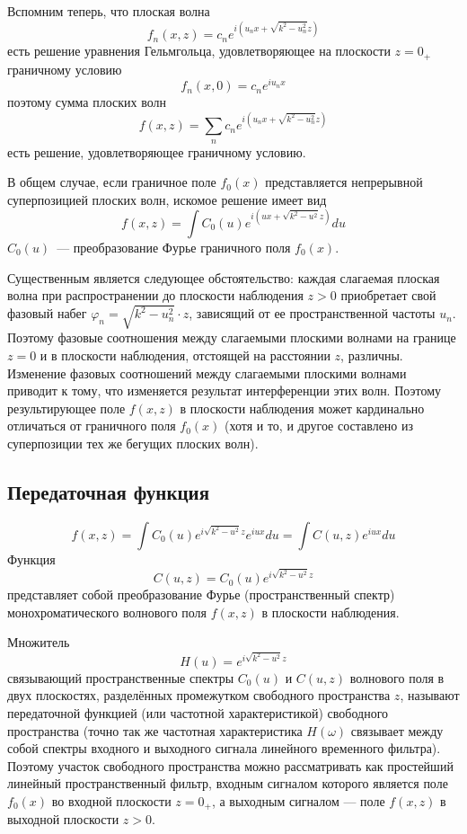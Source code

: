 Вспомним теперь, что плоская волна
\[
    f_n(x, z) = c_n e^{i(u_nx + \sqrt{k^2-u_n^2}z)}
\]
есть решение уравнения Гельмгольца, удовлетворяющее на плоскости $z=0_+$ граничному условию
\[
    f_n(x, 0) = c_n e^{iu_nx}
\]
поэтому сумма плоских волн
\[
    f(x,z) = \sum_n c_n e^{i(u_nx + \sqrt{k^2-u_n^2}z)}
\]
есть решение, удовлетворяющее граничному условию.

В общем случае, если граничное поле $f_0(x)$ представляется непрерывной суперпозицией плоских волн, искомое решение имеет вид
\[
    f(x,z) = \int C_0(u) e^{i(ux+\sqrt{k^2-u^2}z)} du
\]
$C_0(u)$~--- преобразование Фурье граничного поля $f_0(x)$.

Существенным является следующее обстоятельство: каждая слагаемая плоская волна при распространении до плоскости наблюдения $z > 0$ приобретает свой фазовый набег $\varphi_n = \sqrt{k^2 - u_n^2}\cdot z$, зависящий от ее пространственной частоты $u_n$. Поэтому фазовые соотношения между слагаемыми плоскими волнами на границе $z=0$ и в плоскости наблюдения, отстоящей на расстоянии $z$,  различны. Изменение фазовых соотношений между слагаемыми плоскими волнами приводит к тому, что изменяется результат интерференции этих волн. Поэтому результирующее поле $f(x,z)$ в плоскости наблюдения может кардинально отличаться от граничного поля $f_0(x)$ (хотя и то, и другое составлено из суперпозиции тех же бегущих плоских волн).

\subsection{Передаточная функция}
\[
f(x,z) = \int C_0(u) e^{i\sqrt{k^2-u^2}z}e^{iux}du = \int C(u,z)e^{iux}du
\]
Функция
\[
C(u,z) = C_0(u) e^{i\sqrt{k^2-u^2}z}
\]
представляет собой преобразование Фурье (пространственный спектр) монохроматического волнового поля $f(x,z)$ в плоскости наблюдения.

Множитель
\[
H(u) = e^{i\sqrt{k^2-u^2}z}
\]
связывающий пространственные спектры $C_0(u)$ и $C(u, z)$ волнового поля в двух плоскостях, разделённых промежутком свободного пространства $z$, называют передаточной функцией (или частотной характеристикой) свободного пространства (точно так же частотная характеристика $H(\omega)$  связывает между собой спектры входного и выходного сигнала линейного временного фильтра). Поэтому участок свободного пространства можно рассматривать как простейший линейный пространственный фильтр, входным сигналом которого является поле $f_0(x)$ во входной плоскости $z=0_+$, а выходным сигналом --- поле $f(x,z)$ в выходной плоскости $z>0$.

